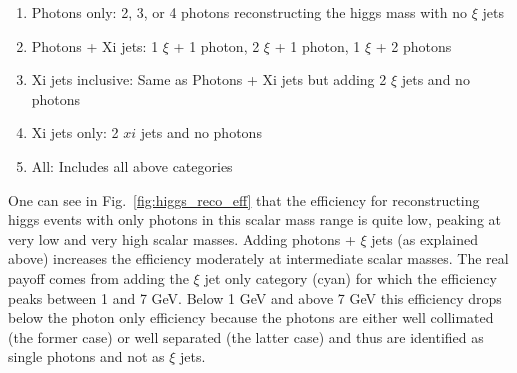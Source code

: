 \documentclass[aps,onecolumn,twoside,secnumarabic,balancelastpage,amsmath,amssymb,nofootinbib,hyperref=pdftex]{revtex4}
\begin{document}
\begin{enumerate}
\item Photons only: 2, 3, or 4 photons reconstructing the higgs mass with no $\xi$ jets 
\item Photons + Xi jets: 1 $\xi$ + 1 photon, 2 $\xi$ + 1 photon, 1 $\xi$ + 2 photons
\item Xi jets inclusive: Same as Photons + Xi jets but adding 2 $\xi$ jets and no photons
\item Xi jets only: 2 $xi$ jets and no photons
\item All: Includes all above categories
\end{enumerate}

One can see in Fig.~\ref{fig:higgs_reco_eff} that the efficiency for reconstructing higgs events with only photons in this scalar mass range is quite low, peaking at very low and very high scalar masses. Adding photons + $\xi$ jets (as explained above) increases the efficiency moderately at intermediate scalar masses. The real payoff comes from adding the $\xi$ jet only category (cyan) for which the efficiency peaks between 1 and 7 GeV. Below 1 GeV and above 7 GeV this efficiency drops below the photon only efficiency because the photons are either well collimated (the former case) or well separated (the latter case) and thus are identified as single photons and not as $\xi$ jets. 
\end{document}
